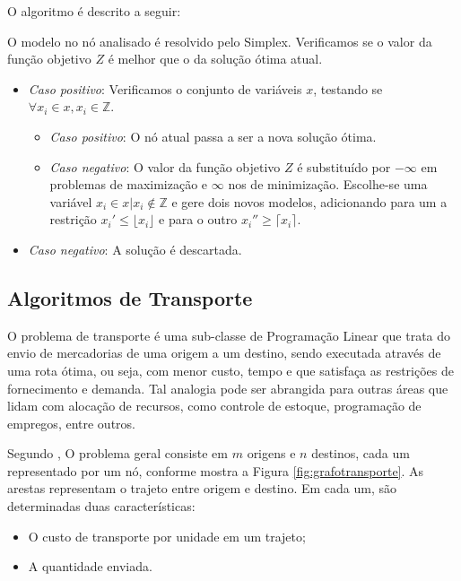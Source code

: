 \documentclass [11pt]{articleSBPO}
\begin{document}
O algoritmo é descrito a seguir:

\bigskip

\noindent O modelo no nó analisado é resolvido pelo Simplex. Verificamos se o valor da função objetivo $Z$ é melhor que o da solução ótima atual.
\begin{itemize}
	\item \textit{Caso positivo}: Verificamos o conjunto de variáveis $x$, testando se $\forall  x_{i} \in x, x_{i} \in \mathbb{Z}$.
	\begin{itemize}
		\item \textit{Caso positivo}: O nó atual passa a ser a nova solução ótima.
		\item \textit{Caso negativo}: O valor da função objetivo $Z$ é substituído por $-\infty$ em problemas de maximização e $\infty$ nos de minimização. Escolhe-se uma variável $x_{i} \in x | x_{i} \notin \mathbb{Z}$ e gere dois novos modelos, adicionando para um a restrição $x_{i}' \leq \lfloor x_{i} \rfloor$ e para o outro $x_{i}'' \geq \lceil x_{i} \rceil$.
	\end{itemize}
	\item \textit{Caso negativo}: A solução é descartada. 
\end{itemize}

\subsection{Algoritmos de Transporte}\label{subsec:transporte}

O problema de transporte é uma sub-classe de Programação Linear que trata do envio de mercadorias de uma origem a um destino, sendo executada através de uma rota ótima, ou seja, com menor custo, tempo e que satisfaça as restrições de fornecimento e demanda. Tal analogia pode ser abrangida para outras áreas que lidam com alocação de recursos, como controle de estoque, programação de empregos, entre outros.

Segundo \cite{taha}, O problema geral consiste em $m$ origens e $n$ destinos, cada um representado por um nó, conforme mostra a Figura \ref{fig:grafotransporte}. As arestas representam o trajeto entre origem e destino. Em cada um, são determinadas duas características:

\begin{itemize}
	\item O custo de transporte por unidade em um trajeto;
	\item A quantidade enviada.
\end{itemize}
\end{document}
